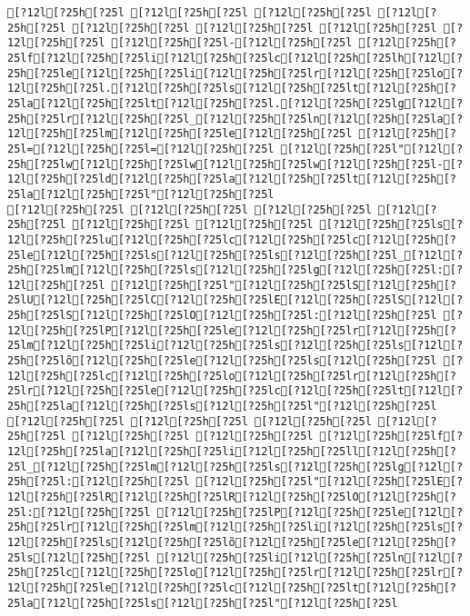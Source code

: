 \documentclass{scrartcl}
\begin{document}
\begin{Verbatim}
[?12l[?25h[?25l [?12l[?25h[?25l [?12l[?25h[?25l [?12l[?25h[?25l [?12l[?25h[?25l [?12l[?25h[?25l [?12l[?25h[?25l [?12l[?25h[?25l [?12l[?25h[?25l-[?12l[?25h[?25l [?12l[?25h[?25lf[?12l[?25h[?25li[?12l[?25h[?25lc[?12l[?25h[?25lh[?12l[?25h[?25le[?12l[?25h[?25li[?12l[?25h[?25lr[?12l[?25h[?25lo[?12l[?25h[?25l.[?12l[?25h[?25ls[?12l[?25h[?25lt[?12l[?25h[?25la[?12l[?25h[?25lt[?12l[?25h[?25l.[?12l[?25h[?25lg[?12l[?25h[?25lr[?12l[?25h[?25l_[?12l[?25h[?25ln[?12l[?25h[?25la[?12l[?25h[?25lm[?12l[?25h[?25le[?12l[?25h[?25l [?12l[?25h[?25l=[?12l[?25h[?25l=[?12l[?25h[?25l [?12l[?25h[?25l"[?12l[?25h[?25lw[?12l[?25h[?25lw[?12l[?25h[?25lw[?12l[?25h[?25l-[?12l[?25h[?25ld[?12l[?25h[?25la[?12l[?25h[?25lt[?12l[?25h[?25la[?12l[?25h[?25l"[?12l[?25h[?25l
[?12l[?25h[?25l [?12l[?25h[?25l [?12l[?25h[?25l [?12l[?25h[?25l [?12l[?25h[?25l [?12l[?25h[?25l [?12l[?25h[?25ls[?12l[?25h[?25lu[?12l[?25h[?25lc[?12l[?25h[?25lc[?12l[?25h[?25le[?12l[?25h[?25ls[?12l[?25h[?25ls[?12l[?25h[?25l_[?12l[?25h[?25lm[?12l[?25h[?25ls[?12l[?25h[?25lg[?12l[?25h[?25l:[?12l[?25h[?25l [?12l[?25h[?25l"[?12l[?25h[?25lS[?12l[?25h[?25lU[?12l[?25h[?25lC[?12l[?25h[?25lE[?12l[?25h[?25lS[?12l[?25h[?25lS[?12l[?25h[?25lO[?12l[?25h[?25l:[?12l[?25h[?25l [?12l[?25h[?25lP[?12l[?25h[?25le[?12l[?25h[?25lr[?12l[?25h[?25lm[?12l[?25h[?25li[?12l[?25h[?25ls[?12l[?25h[?25ls[?12l[?25h[?25lõ[?12l[?25h[?25le[?12l[?25h[?25ls[?12l[?25h[?25l [?12l[?25h[?25lc[?12l[?25h[?25lo[?12l[?25h[?25lr[?12l[?25h[?25lr[?12l[?25h[?25le[?12l[?25h[?25lc[?12l[?25h[?25lt[?12l[?25h[?25la[?12l[?25h[?25ls[?12l[?25h[?25l"[?12l[?25h[?25l
[?12l[?25h[?25l [?12l[?25h[?25l [?12l[?25h[?25l [?12l[?25h[?25l [?12l[?25h[?25l [?12l[?25h[?25l [?12l[?25h[?25lf[?12l[?25h[?25la[?12l[?25h[?25li[?12l[?25h[?25ll[?12l[?25h[?25l_[?12l[?25h[?25lm[?12l[?25h[?25ls[?12l[?25h[?25lg[?12l[?25h[?25l:[?12l[?25h[?25l [?12l[?25h[?25l"[?12l[?25h[?25lE[?12l[?25h[?25lR[?12l[?25h[?25lR[?12l[?25h[?25lO[?12l[?25h[?25l:[?12l[?25h[?25l [?12l[?25h[?25lP[?12l[?25h[?25le[?12l[?25h[?25lr[?12l[?25h[?25lm[?12l[?25h[?25li[?12l[?25h[?25ls[?12l[?25h[?25ls[?12l[?25h[?25lõ[?12l[?25h[?25le[?12l[?25h[?25ls[?12l[?25h[?25l [?12l[?25h[?25li[?12l[?25h[?25ln[?12l[?25h[?25lc[?12l[?25h[?25lo[?12l[?25h[?25lr[?12l[?25h[?25lr[?12l[?25h[?25le[?12l[?25h[?25lc[?12l[?25h[?25lt[?12l[?25h[?25la[?12l[?25h[?25ls[?12l[?25h[?25l"[?12l[?25h[?25l

\end{Verbatim}
\end{document}

